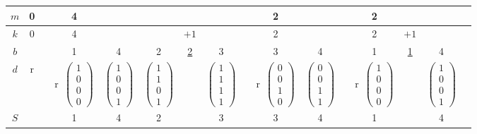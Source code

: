 \documentclass[journal]{IEEEtran}
\begin{document}
\begin{table*}[!t]
\centering
\begin{tabular}{|c|cc|cccccc|ccc|cccc|}
\hline
$m$ &0 & &4 & & & & & &2& &&2&&  &  \\ \hline
$k$ &0 & &4 & & &$+1$ & & &2& &&2&$+1$&  &  \\ \hline
$b$  &  & &1 &4&2&\underline{2}       &3& &3&4&&1&\underline{1}      &4&\\ \hline
$d$  &r  & &r~$\left(\begin{array}{c}1\\0\\0\\0\end{array}\right)$ & $\left(\begin{array}{c}1\\0\\0\\1\end{array}\right)$ & $\left(\begin{array}{c}1\\1\\0\\1\end{array}\right)$ & & $\left(\begin{array}{c}1\\1\\1\\1\end{array}\right)$ && r~$\left(\begin{array}{c}0\\0\\1\\0\end{array}\right)$ &$\left(\begin{array}{c}0\\0\\1\\1\end{array}\right)$ &&r~$\left(\begin{array}{c}1\\0\\0\\0\end{array}\right)$ & &$\left(\begin{array}{c}1\\0\\0\\1\end{array}\right)$  &  \\ \hline
$S$  &  & &1 &4&2&        &3& &3&4&&1& &4 &  \\ \hline

\end{tabular}
\end{table*}
\end{document}
